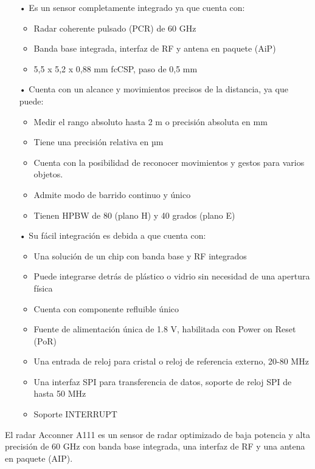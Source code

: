 \begin{itemize}
    \item[•] Es un sensor completamente integrado ya que cuenta con:
    \begin{itemize}
        \item Radar coherente pulsado (PCR) de 60 GHz
        \item Banda base integrada, interfaz de RF y antena en paquete (AiP)
		\item 5,5 x 5,2 x 0,88 mm fcCSP, paso de 0,5 mm
    \end{itemize}
    \item[•] Cuenta con un alcance y movimientos precisos de la distancia, ya que puede:
    \begin{itemize}
        \item Medir el rango absoluto hasta 2 m o precisión absoluta en mm
		\item Tiene una precisión relativa en µm
		\item Cuenta con la posibilidad de reconocer movimientos y gestos para varios objetos.
		\item Admite modo de barrido continuo y único
		\item Tienen HPBW de 80 (plano H) y 40 grados (plano E)
    \end{itemize}
    \item[•] Su fácil integración es debida a que cuenta con:
    \begin{itemize}
        \item Una solución de un chip con banda base y RF integrados
		\item Puede integrarse detrás de plástico o vidrio sin necesidad de una apertura física
		\item Cuenta con componente refluible único
		\item Fuente de alimentación única de 1.8 V, habilitada con Power on Reset (PoR)
		\item Una entrada de reloj para cristal o reloj de referencia externo, 20-80 MHz
		\item Una interfaz SPI para transferencia de datos, soporte de reloj SPI de hasta 50 MHz
		\item Soporte INTERRUPT
    \end{itemize}
\end{itemize}

El radar Acconner A111 es un sensor de radar optimizado de baja potencia y alta precisión de 60 GHz con banda base integrada, una interfaz de RF y una antena en paquete (AIP).

